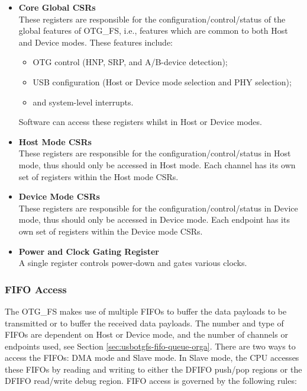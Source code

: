 \documentclass[main\_\_EN.tex]{subfiles}
\begin{document}
\begin{itemize}
    \item {\bfseries Core Global CSRs}\\
    These registers are responsible for the configuration/control/status of the global features of OTG\_FS, i.e., features which are common to both Host and Device modes. These features include:
    \begin{itemize}
        \item OTG control (HNP, SRP, and A/B-device detection);
        \item USB configuration (Host or Device mode selection and PHY selection);
        \item and system-level interrupts.
    \end{itemize}
    Software can access these registers whilst in Host or Device modes.

    \item{\bfseries Host Mode CSRs}\\
    These registers are responsible for the configuration/control/status in Host mode, thus should only be accessed in Host mode. Each channel has its own set of registers within the Host mode CSRs.

    \item{\bfseries Device Mode CSRs}\\
    These registers are responsible for the configuration/control/status in Device mode, thus should only be accessed in Device mode. Each endpoint has its own set of registers within the Device mode CSRs.

    \item {\bfseries Power and Clock Gating Register}\\
    A single register controls power-down and gates various clocks.
\end{itemize}

\subsubsection{FIFO Access}

The OTG\_FS makes use of multiple FIFOs to buffer the data payloads to be transmitted or to buffer the received data payloads. The number and type of FIFOs are dependent on Host or Device mode, and the number of channels or endpoints used, see Section \ref{sec:usbotgfs-fifo-queue-orga}. There are two ways to access the FIFOs: DMA mode and Slave mode. In Slave mode, the CPU accesses these FIFOs by reading and writing to either the DFIFO push/pop regions or the DFIFO read/write debug region. FIFO access is governed by the following rules:
\end{document}
